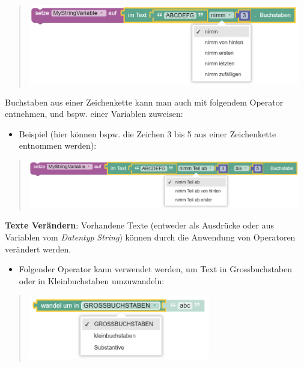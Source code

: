 \documentclass[
  letterpaper,
  DIV=11]{scrreprt}
\providecommand{\tightlist}{%
  \setlength{\itemsep}{0pt}\setlength{\parskip}{0pt}}\usepackage{longtable,booktabs,array}
\begin{document}
\begin{tcolorbox}
\begin{quote}
\includegraphics[width=4.6875in,height=\textheight]{img/screenshot-blockly-text-substring-operator-example-01-DEU.png}
\end{quote}

Buchstaben aus einer Zeichenkette kann man auch mit folgendem Operator
entnehmen, und bspw. einer Variablen zuweisen:

\begin{itemize}
\tightlist
\item
  Beispiel (hier können bspw. die Zeichen 3 bis 5 aus einer Zeichenkette
  entnommen werden):
\end{itemize}

\begin{quote}
\includegraphics[width=4.6875in,height=\textheight]{img/screenshot-blockly-text-substring2-operator-example-01-DEU.png}
\end{quote}

\textbf{Texte Verändern}: Vorhandene Texte (entweder als Ausdrücke oder
aus Variablen vom \emph{Datentyp} \emph{String}) können durch die
Anwendung von Operatoren verändert werden.

\begin{itemize}
\tightlist
\item
  Folgender Operator kann verwendet werden, um Text in Grossbuchstaben
  oder in Kleinbuchstaben umzuwandeln:
\end{itemize}

\begin{quote}
\includegraphics[width=3.125in,height=\textheight]{img/screenshot-blockly-text-upper-lower-operator-example-01-DEU.png}
\end{quote}


\end{tcolorbox}
\end{document}
